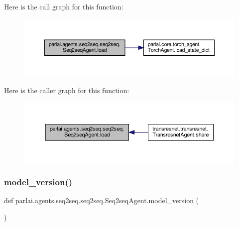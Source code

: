 Here is the call graph for this function\+:
\nopagebreak
\begin{figure}[H]
\begin{center}
\leavevmode
\includegraphics[width=350pt]{classparlai_1_1agents_1_1seq2seq_1_1seq2seq_1_1Seq2seqAgent_a6f94b2896a2a76476f8646ec7d9360ed_cgraph}
\end{center}
\end{figure}
Here is the caller graph for this function\+:
\nopagebreak
\begin{figure}[H]
\begin{center}
\leavevmode
\includegraphics[width=350pt]{classparlai_1_1agents_1_1seq2seq_1_1seq2seq_1_1Seq2seqAgent_a6f94b2896a2a76476f8646ec7d9360ed_icgraph}
\end{center}
\end{figure}
\mbox{\label{classparlai_1_1agents_1_1seq2seq_1_1seq2seq_1_1Seq2seqAgent_aba4b52b4f15795eeda202cb303525483}} 
\subsubsection{\texorpdfstring{model\+\_\+version()}{model\_version()}}
{\footnotesize\ttfamily def parlai.\+agents.\+seq2seq.\+seq2seq.\+Seq2seq\+Agent.\+model\+\_\+version (\begin{DoxyParamCaption}{ }\end{DoxyParamCaption})\hspace{0.3cm}{\ttfamily [static]}}

